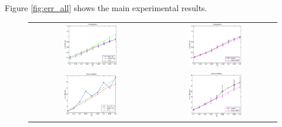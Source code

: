 Figure \ref{fig:err_all} shows the main experimental results.

\begin{figure}[htbp]
  \begin{center}
    \begin{tabular}{cc}
      \includegraphics[width=0.45\textwidth]{error_pos.eps} &
      \includegraphics[width=0.45\textwidth]{error_cmp_pos.eps} \\
      \includegraphics[width=0.45\textwidth]{error_ori.eps} &
      \includegraphics[width=0.45\textwidth]{error_cmp_ori.eps} \\

\end{tabular}
\end{center}
\end{figure}
